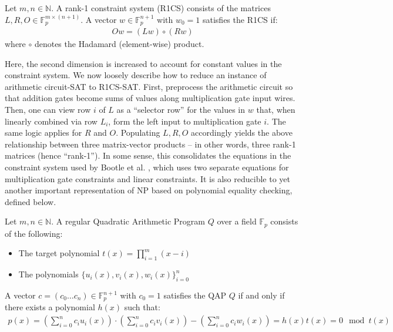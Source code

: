 \begin{definition}\label{def:r1cs}
\noindent Let $m, n \in \mathbb{N}$. A rank-1 constraint system (R1CS) consists of the matrices $L, R, O \in \mathbb{F}_{p}^{m \times (n+1)}$. A vector $w \in \mathbb{F}_p^{n+1}$ with $w_0 = 1$ satisfies the R1CS if:
\begin{align}
    Ow = (Lw) \circ (Rw)
\end{align}
\noindent where $\circ$ denotes the Hadamard (element-wise) product.
\end{definition}

\noindent Here, the second dimension is increased to account for constant values in the constraint system. We now loosely describe how to reduce an instance of arithmetic circuit-SAT to R1CS-SAT. First, preprocess the arithmetic circuit so that addition gates become sums of values along multiplication gate input wires. Then, one can view row $i$ of $L$ as a ``selector row'' for the values in $w$ that, when linearly combined via row $L_i$, form the left input to multiplication gate $i$. The same logic applies for $R$ and $O$. Populating $L, R, O$ accordingly yields the above relationship between three matrix-vector products -- in other words, three rank-1 matrices (hence ``rank-1''). In some sense, this consolidates the equations in the constraint system used by Bootle et al. \cite{bootlezkargs}, which uses two separate equations for multiplication gate constraints and linear constraints. It is also reducible to yet another important representation of NP based on polynomial equality checking, defined below.

\begin{definition}\label{def:qap}
\noindent Let $m, n \in \mathbb{N}$. A regular Quadratic Arithmetic Program $Q$ over a field $\mathbb{F}_p$ consists of the following:
\begin{itemize}
    \item The target polynomial $t(x) = \prod_{i=1}^m (x - i)$
    \item The polynomials $\{u_i(x), v_i(x), w_i(x)\}_{i=0}^n$ %
\end{itemize}

\noindent A vector $c = (c_0 \dots c_n) \in \mathbb{F}_p^{n+1}$ with $c_0 = 1$ satisfies the QAP $Q$ if and only if there exists a polynomial $h(x)$ such that:
\begin{align}
    p(x) = \left(\sum_{i=0}^n c_i u_i(x)\right) \cdot \left(\sum_{i=0}^n c_i v_i(x)\right) - \left(\sum_{i=0}^n c_i w_i(x)\right) = h(x)t(x) = 0 \mod t(x)
\end{align}
\end{definition}

